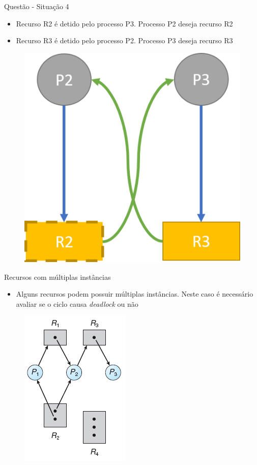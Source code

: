 \documentclass[aspectratio=169,
				xcolor=table]{beamer}
\begin{document}
	\begin{frame}{Questão - Situação 4}
		\begin{itemize}
			\item Recurso R2 é detido pelo processo P3. Processo P2 deseja recurso R2
			\item Recurso R3 é detido pelo processo P2. Processo P3 deseja recurso R3
		\end{itemize}
		\begin{figure}
			\centering
			\includegraphics[keepaspectratio, height=0.7\paperheight]{../figs/cap07/exercicio05.png}			
		\end{figure}		
	\end{frame}
	
	\begin{frame}{Recursos com múltiplas instâncias}
		\begin{itemize}
			\item Alguns recursos podem possuir múltiplas instâncias. Neste caso é necessário avaliar se o ciclo causa \textit{deadlock} ou não		
		\end{itemize}
		
		\begin{figure}
			\centering
			\includegraphics[keepaspectratio, height=0.7\paperheight]{../figs/cap07/recursomulti.png}			
		\end{figure}
	\end{frame}
\end{document}
